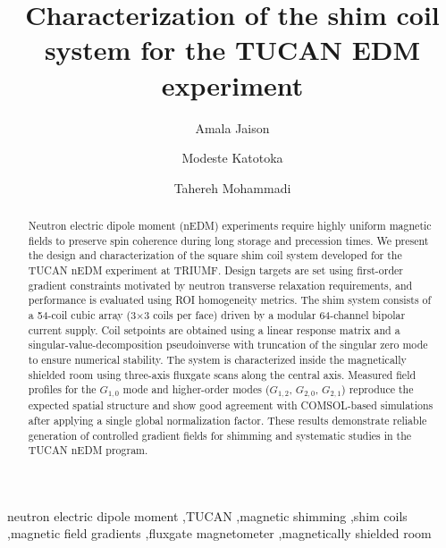 \documentclass[preprint,12pt]{elsarticle}
\begin{document}
\begin{frontmatter}

\title{Characterization of the shim coil system for the TUCAN EDM experiment}

\author[uwinnipeg]{Amala Jaison}

\author[umanitoba]{Modeste Katotoka}

\author[umanitoba]{Tahereh Mohammadi}




\begin{abstract}
Neutron electric dipole moment (nEDM) experiments require highly uniform magnetic fields to preserve spin coherence during long storage and precession times. We present the design and characterization of the square shim coil system developed for the TUCAN nEDM experiment at TRIUMF. Design targets are set using first-order gradient constraints motivated by neutron transverse relaxation requirements, and performance is evaluated using ROI homogeneity metrics. The shim system consists of a 54-coil cubic array (3$\times$3 coils per face) driven by a modular 64-channel bipolar current supply. Coil setpoints are obtained using a linear response matrix and a singular-value-decomposition pseudoinverse with truncation of the singular zero mode to ensure numerical stability. The system is characterized inside the magnetically shielded room using three-axis fluxgate scans along the central axis. Measured field profiles for the $G_{1,0}$ mode and higher-order modes ($G_{1,2}$, $G_{2,0}$, $G_{2,1}$) reproduce the expected spatial structure and show good agreement with COMSOL-based simulations after applying a single global normalization factor. These results demonstrate reliable generation of controlled gradient fields for shimming and systematic studies in the TUCAN nEDM program.
\end{abstract}

\begin{keyword}
neutron electric dipole moment \sep TUCAN \sep magnetic shimming \sep shim coils \sep magnetic field gradients \sep fluxgate magnetometer \sep magnetically shielded room
\end{keyword}

\end{frontmatter}
\end{document}
